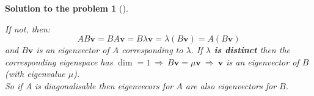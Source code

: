 \documentclass[12pt,a4]{article}
\newtheorem{solution}{Solution to the problem}
\newcommand\ls{\operatorname{ls}}
\newcommand{\bv}{{\mathbf v}}
\begin{document}
{\begin{solution}[]
\begin{enumerate}[(a)]
If not, then:
\[
AB\bv = BA\bv = B\lambda\bv =  \lambda (B\bv) = A(B\bv)
\]
and $B\bv$ is an eigenvector of $A$ corresponding to $\lambda$. If \textbf{$\lambda$ is distinct} then the corresponding eigenspace has $\dim = 1 ~\Rightarrow~ B\bv = \mu \bv ~\Rightarrow~  \bv$ is an eigenvector of $B$ (with eigenvalue $\mu$).\\[5pt]
So if A is diagonalisable then eigenvecors for $A$ are also eigenvectors for $B$.
\end{enumerate}
\end{solution}
}
\end{document}
